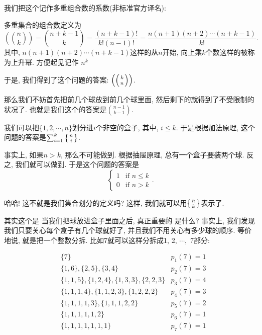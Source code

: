 我们把这个记作多重组合数的系数(非标准官方译名): 

\begin{definition}[多重集合组合数]
  多重集合的组合数定义为
  $$
  \left(\binom nk\right)=\binom{n+k-1}k=\frac{(n+k-1)!}{k!\left(n-1\right)!}=\frac{n(n+1)(n+2)\cdots(n+k-1)}{k!}.
  $$
  其中, $n(n+1)(n+2)\cdots(n+k-1)$这样的从$n$开始, 向上乘$k$个数这样的被称为上升幂. 方便起见记作
  $n^{\bar k}$
\end{definition}
于是, 我们得到了这个问题的答案: $\left(\left({k \atop n}\right)\right)$. 

 那么我们不妨首先把前几个球放到前几个球里面, 
然后剩下的就得到了不受限制的状况了. 也就是我们这个的答案是${n-1\choose k-1}. $

 我们可以把$\{1,2,\cdots,n\}$划分进$i$个非空的盒子, 
其中, $i\leq k$. 于是根据加法原理, 这个问题的答案是$\sum_{i=1}^{k}\left\{{n \atop i}\right\}$. 

 事实上, 如果$n>k$, 那么不可能做到.
根据抽屉原理, 总有一个盒子要装两个球. 反之, 我们就可以做到. 于是这个问题的答案是$$\begin{cases}1 & \text{if }n\leq k\\ 0& \text{if }n>k\end{cases}.$$

 哈哈! 这不就是我们集合划分的定义吗? 
这样, 我们就可以用$\left\{{n \atop k}\right\}$表示了.

 其实这个是
当我们把球放进盒子里面之后, 真正重要的
是什么? 事实上, 我们发现我们只要关心每个盒子有几个球就好了, 并且我们不用关心有多少球的顺序. 
等价地说, 就是把一个整数分拆. 比如7就可以这样分拆成1, 2, $\cdots,$ 7部分:

$$
\begin{aligned}
&\{7\}
& p_1(7)=1\\
&\{1,6\},\{2,5\},\{3,4\}
& p_2(7)=3\\
&\{1,1,5\}, \{1,2,4\}, \{1,3,3\}, \{2,2,3\} 
& p_3(7)=4\\
&\{1,1,1,4\},\{1,1,2,3\}, \{1,2,2,2\}
& p_4(7)=3\\
&\{1,1,1,1,3\},\{1,1,1,2,2\}
& p_5(7)=2\\
&\{1,1,1,1,1,2\}
& p_6(7)=1\\
&\{1,1,1,1,1,1,1\}
& p_7(7)=1
\end{aligned}
$$

